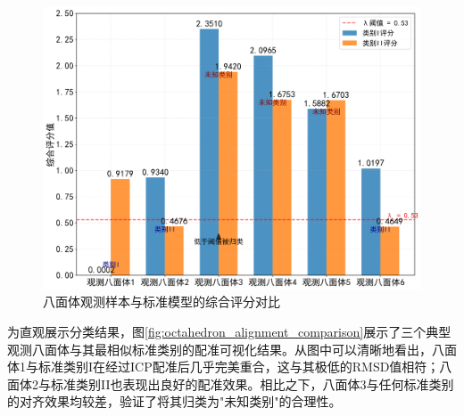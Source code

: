 \begin{figure}[H]
    \centering
    \includegraphics[width=1.0\textwidth]{figures2/analysis/octahedron_classification_scores.png}
    \caption{八面体观测样本与标准模型的综合评分对比}
    \label{fig:octahedron_classification_scores}
\end{figure}

为直观展示分类结果，图\ref{fig:octahedron_alignment_comparison}展示了三个典型观测八面体与其最相似标准类别的配准可视化结果。从图中可以清晰地看出，八面体1与标准类别I在经过ICP配准后几乎完美重合，这与其极低的RMSD值相符；八面体2与标准类别II也表现出良好的配准效果。相比之下，八面体3与任何标准类别的对齐效果均较差，验证了将其归类为"未知类别"的合理性。
    
